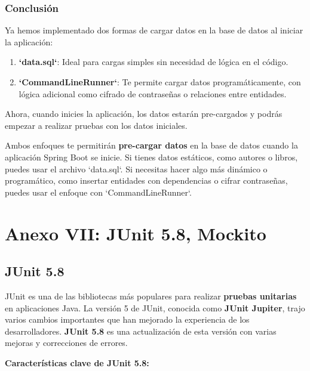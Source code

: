 \documentclass[11pt]{article}
\begin{document}
\subsubsection{Conclusión}
\label{sec:orge9ce05d}

Ya hemos implementado dos formas de cargar datos en la base de datos al iniciar la aplicación:

\begin{enumerate}
\item \textbf{\textbf{`data.sql`}}: Ideal para cargas simples sin necesidad de lógica en el código.
\item \textbf{\textbf{`CommandLineRunner`}}: Te permite cargar datos programáticamente, con lógica adicional como cifrado de contraseñas o relaciones entre entidades.
\end{enumerate}

Ahora, cuando inicies la aplicación, los datos estarán pre-cargados y podrás empezar a realizar pruebas con los datos iniciales.


Ambos enfoques te permitirán \textbf{\textbf{pre-cargar datos}} en la base de datos cuando la aplicación Spring Boot se inicie. Si tienes datos estáticos, como autores o libros, puedes usar el archivo `data.sql`. Si necesitas hacer algo más dinámico o programático, como insertar entidades con dependencias o cifrar contraseñas, puedes usar el enfoque con `CommandLineRunner`.


\section{Anexo VII:  JUnit 5.8, Mockito}
\label{sec:org96a3271}
\subsection{JUnit 5.8}
\label{sec:org71224a2}

JUnit es una de las bibliotecas más populares para realizar \textbf{\textbf{pruebas unitarias}} en aplicaciones Java. La versión 5 de JUnit, conocida como \textbf{\textbf{JUnit Jupiter}}, trajo varios cambios importantes que han mejorado la experiencia de los desarrolladores. \textbf{\textbf{JUnit 5.8}} es una actualización de esta versión con varias mejoras y correcciones de errores.

\textbf{\textbf{Características clave de JUnit 5.8:}}
\end{document}
